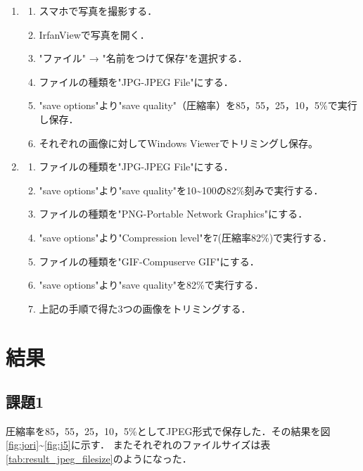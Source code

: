 \documentclass[a4paper,11pt]{bxjsarticle}
\begin{document}
\begin{enumerate}
  \item \begin{enumerate}
          \item スマホで写真を撮影する．
          \item IrfanViewで写真を開く．
          \item "ファイル" → "名前をつけて保存"を選択する．
          \item ファイルの種類を"JPG-JPEG File"にする．
          \item "save options"より"save quality"（圧縮率）を85，55，25，10，5\%で実行し保存．
          \item それぞれの画像に対してWindows Viewerでトリミングし保存。
        \end{enumerate}
  \item \begin{enumerate}
          \item ファイルの種類を"JPG-JPEG File"にする．
          \item "save options"より"save quality"を10\textasciitilde100の82\%刻みで実行する．
          \item ファイルの種類を"PNG-Portable Network Graphics"にする．
          \item "save options"より"Compression level"を7(圧縮率82\%)で実行する．
          \item ファイルの種類を"GIF-Compuserve GIF"にする．
          \item "save options"より"save quality"を82\%で実行する．
          \item 上記の手順で得た3つの画像をトリミングする．
        \end{enumerate}
\end{enumerate}

\section{結果}
  \subsection{課題1}
  圧縮率を85，55，25，10，5\%としてJPEG形式で保存した．その結果を図\ref{fig:jori}\textasciitilde\ref{fig:j5}に示す．
  またそれぞれのファイルサイズは表\ref{tab:result_jpeg_filesize}のようになった．
\end{document}
